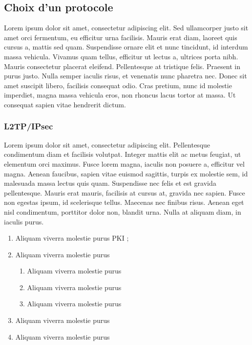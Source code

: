 \documentclass[a4paper,12pt]{report}
\begin{document}
\subsection{Choix d'un protocole} %
Lorem ipsum dolor sit amet, consectetur adipiscing elit. Sed ullamcorper justo sit amet orci fermentum, eu efficitur urna facilisis. Mauris erat diam, laoreet quis cursus a, mattis sed quam. Suspendisse ornare elit et nunc tincidunt, id interdum massa vehicula. Vivamus quam tellus, efficitur ut lectus a, ultrices porta nibh. Mauris consectetur placerat eleifend. Pellentesque at tristique felis. Praesent in purus justo. Nulla semper iaculis risus, et venenatis nunc pharetra nec. Donec sit amet suscipit libero, facilisis consequat odio. Cras pretium, nunc id molestie imperdiet, magna massa vehicula eros, non rhoncus lacus tortor at massa. Ut consequat sapien vitae hendrerit dictum.

\subsubsection{L2TP/IPsec}   %
Lorem ipsum dolor sit amet, consectetur adipiscing elit. Pellentesque condimentum diam et facilisis volutpat. Integer mattis elit ac metus feugiat, ut elementum orci maximus. Fusce lorem magna, iaculis non posuere a, efficitur vel magna. Aenean faucibus, sapien vitae euismod sagittis, turpis ex molestie sem, id malesuada massa lectus quis quam. Suspendisse nec felis et est gravida pellentesque. Mauris erat mauris, facilisis at cursus at, gravida nec sapien. Fusce non egestas ipsum, id scelerisque tellus. Maecenas nec finibus risus. Aenean eget nisl condimentum, porttitor dolor non, blandit urna. Nulla at aliquam diam, in iaculis purus.

\begin{enumerate}[label=∞ \arabic*)]
\item Aliquam viverra molestie purus\ac{ PKI} ;
\item Aliquam viverra molestie purus
	\begin{enumerate}[label= :) ]
  		 \item  Aliquam viverra molestie purus
  		 \item  Aliquam viverra molestie purus
  		 \item  Aliquam viverra molestie purus
	\end{enumerate}
\item Aliquam viverra molestie purus
\item Aliquam viverra molestie purus
\end{enumerate}
\end{document}
